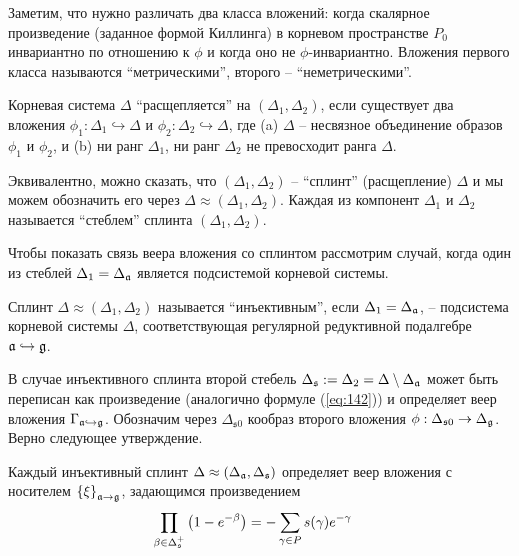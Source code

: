 \documentclass[14pt,autoref,href,facsimile
]{disser}
\begin{document}
Заметим, что нужно различать два класса вложений: когда скалярное произведение (заданное формой Киллинга) в корневом пространстве $P_0$ инвариантно по отношению к  $\phi$ и когда оно не  $\phi$-инвариантно. Вложения первого класса называются ``метрическими'', второго -- ``неметрическими''. 

\begin{definition}
Корневая система $\Delta$ ``расщепляется'' на  $(\Delta _{1},\Delta _{2})$, если существует два вложения  $\phi _{1}:\Delta _{1}\hookrightarrow \Delta $ и $\phi _{2}:\Delta _{2}\hookrightarrow \Delta $, где (a) $\Delta $ -- несвязное объединение образов $\phi _{1}$ и $\phi _{2}$, и (b) ни ранг  $\Delta _{1}$, ни ранг  $\Delta _{2}$ не превосходит ранга $\Delta $.
\end{definition}

Эквивалентно, можно сказать, что  $(\Delta_1,\Delta_2)$  -- ``сплинт'' (расщепление)  $\Delta$ и мы можем обозначить его через $\Delta \approx (\Delta_1,\Delta_2)$. Каждая из компонент  $\Delta_1$ и $\Delta_2$ называется ``стеблем'' сплинта $(\Delta_1,\Delta_2)$.

Чтобы показать связь веера вложения со сплинтом рассмотрим случай, когда один из стеблей $\Delta _{1}=\Delta _{\mathfrak{a}}$  является подсистемой корневой системы. 

Сплинт $\Delta \approx (\Delta _{1},\Delta _{2})$ называется ``инъективным'', если $\Delta _{1}=\Delta _{\mathfrak{a}}$, -- подсистема корневой системы $\Delta $, соответствующая регулярной редуктивной подалгебре $\mathfrak{a}\hookrightarrow \mathfrak{g}$. 

В случае инъективного сплинта второй стебель $\Delta _{\mathfrak{s}}:=\Delta_{2}=\Delta \setminus \Delta _{\mathfrak{a}}$ может быть переписан как произведение (аналогично формуле (\ref{eq:142})) и определяет веер вложения  $\Gamma _{\mathfrak{a}\hookrightarrow \mathfrak{g}}$. Обозначим через $\Delta_{\mathfrak{s}0}$ кообраз второго вложения $\phi:\Delta_{\mathfrak{s}0}\to \Delta_{\mathfrak{g}}$. Верно следующее утверждение.

\begin{statement}
Каждый инъективный сплинт $\Delta \approx (\Delta _{\mathfrak{a}},\Delta _{\mathfrak{s}})$ определяет веер вложения с носителем $\left\{ \xi \right\} _{\mathfrak{a}\rightarrow \mathfrak{g}}$, задающимся произведением
\begin{equation}
\prod_{\beta \in \Delta _{\mathfrak{s}}^{+}}\left( 1-e^{-\beta }\right)
=-\sum_{\gamma \in P}s(\gamma )e^{-\gamma }\quad   \label{splint product}
\end{equation}
\end{statement}
\end{document}
